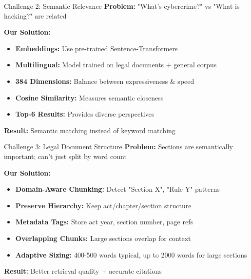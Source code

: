 \documentclass[11pt,aspectratio=16:9]{beamer}
\begin{document}
\begin{frame}{Challenge 2: Semantic Relevance}
    \textbf{Problem:} "What's cybercrime?" vs "What is hacking?" are related
    
    \vspace{0.5cm}
    
    \textbf{Our Solution:}
    \begin{itemize}
        \item \textbf{Embeddings:} Use pre-trained Sentence-Transformers
        \item \textbf{Multilingual:} Model trained on legal documents + general corpus
        \item \textbf{384 Dimensions:} Balance between expressiveness \& speed
        \item \textbf{Cosine Similarity:} Measures semantic closeness
        \item \textbf{Top-6 Results:} Provides diverse perspectives
    \end{itemize}
    
    \vspace{0.5cm}
    
    \textbf{Result:} Semantic matching instead of keyword matching
\end{frame}

\begin{frame}{Challenge 3: Legal Document Structure}
    \textbf{Problem:} Sections are semantically important; can't just split by word count
    
    \vspace{0.5cm}
    
    \textbf{Our Solution:}
    \begin{itemize}
        \item \textbf{Domain-Aware Chunking:} Detect "Section X", "Rule Y" patterns
        \item \textbf{Preserve Hierarchy:} Keep act/chapter/section structure
        \item \textbf{Metadata Tags:} Store act year, section number, page refs
        \item \textbf{Overlapping Chunks:} Large sections overlap for context
        \item \textbf{Adaptive Sizing:} 400-500 words typical, up to 2000 words for large sections
    \end{itemize}
    
    \vspace{0.5cm}
    
    \textbf{Result:} Better retrieval quality + accurate citations
\end{frame}
\end{document}
